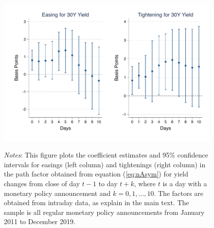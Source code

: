 \documentclass{article}
\begin{document}
\begin{figure}[tbph]
\begin{center}
		\includegraphics[trim={0.6cm 0cm 0.5cm 0cm},clip,height=.2\textheight,width=1\textwidth]{persistasypthgmxn30yr} \\
	\end{center}
	
	\vspace{-0.4cm} \caption*{\footnotesize{\textit{Notes}: This figure plots the coefficient estimates and 95\% confidence intervals for easings (left column) and tightenings (right column) in the path factor obtained from equation (\ref{eq:nAsym}) for yield changes from close of day \(t - 1\) to day \(t + k\), where \(t\) is a day with a monetary policy announcement and \(k = 0, 1, \ldots, 10\). The factors are obtained from intraday data, as explain in the main text. The sample is all regular monetary policy announcements from January 2011 to December 2019.}}
\end{figure}


%	
%	
\end{document}
